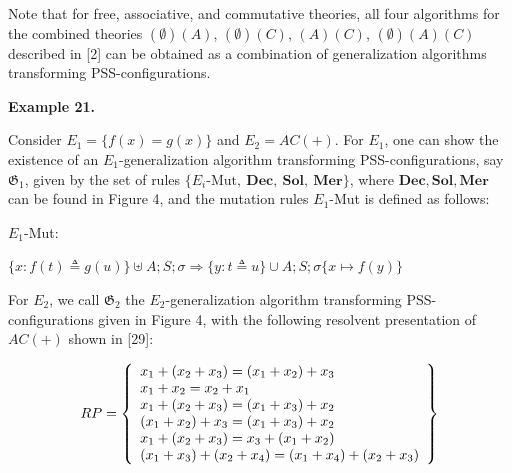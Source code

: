 \documentclass[10pt,a4paper]{amsart}
\begin{document}
 
 
 
Note that for free, associative, and commutative theories, all four algorithms for the combined theories $(\emptyset)(A)$, $(\emptyset)(C)$, $(A)(C)$, $(\emptyset)(A)(C)$ described in [2] can be obtained as a combination of generalization algorithms transforming PSS-configurations.\par
 
 
 
\par\medskip\noindent\textbf{Example 21.}\par
 
 
Consider $E_{1}=\{f(x)=g(x)\}$ and $E_{2}=AC(+)$. For $E_{1}$, one can show the existence of an $E_{1}$-generalization algorithm transforming PSS-configurations, say $\mathfrak{G}_{1}$, given by the set of rules $\{\text{$E_{i}$-{Mut}},\ \textbf{Dec},\ \textbf{Sol},\ \textbf{Mer}\}$, where $\textbf{Dec},\textbf{Sol},\textbf{Mer}$ can be found in Figure 4, and the mutation rules $E_{1}$-Mut is defined as follows:\par
 
  
 
\par
 
$E_{1}$-Mut:\par
 
\par
 
$\{x:f(t)\triangleq g(u)\}\uplus A;S;\sigma\Longrightarrow\{y:t\triangleq u\}\cup A;S;\sigma\{x\mapsto f(y)\}$\par
 
  
 
For $E_{2}$, we call $\mathfrak{G}_{2}$ the $E_{2}$-generalization algorithm transforming PSS-configurations given in Figure 4, with the following resolvent presentation of $AC(+)$ shown in [29]:\par
  
\par  \quad  \[RP=\left\{\begin{array}[]{l}x_{1}+(x_{2}+x_{3})=(x_{1}+x_{2})+x_{3}\\
x_{1}+x_{2}=x_{2}+x_{1}\\
x_{1}+(x_{2}+x_{3})=(x_{1}+x_{3})+x_{2}\\
(x_{1}+x_{2})+x_{3}=(x_{1}+x_{3})+x_{2}\\
x_{1}+(x_{2}+x_{3})=x_{3}+(x_{1}+x_{2})\\
(x_{1}+x_{3})+(x_{2}+x_{4})=(x_{1}+x_{4})+(x_{2}+x_{3})\end{array}\right\}\]\quad  \quad  
  
\end{document}
